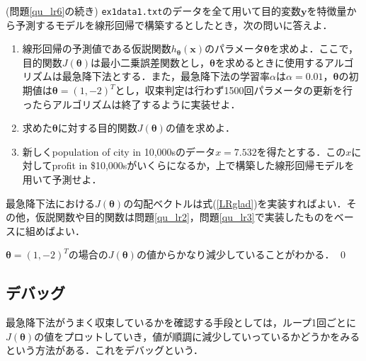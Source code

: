 \begin{qu}\label{qu_lr4}
(問題\ref{qu_lr6}の続き) \texttt{ex1data1.txt}のデータを全て用いて目的変数${\bm y}$を特徴量から予測するモデルを線形回帰で構築するとしたとき，次の問いに答えよ．
\begin{enumerate}
\item 線形回帰の予測値である仮説関数$h_{{\bm \theta}}({\bm x})$のパラメータ${\bm \theta}$を求めよ．ここで，目的関数$J({\bm \theta})$は最小二乗誤差関数とし，${\bm \theta}$を求めるときに使用するアルゴリズムは最急降下法とする．また，最急降下法の学習率$\alpha $は$\alpha = 0.01$，${\bm \theta}$の初期値は${\bm \theta}=(1,-2)^T$とし，収束判定は行わず1500回パラメータの更新を行ったらアルゴリズムは終了するように実装せよ．
\item 求めた${\bm \theta}$に対する目的関数$J({\bm \theta})$の値を求めよ．
\item 新しくpopulation of city in 10,000sのデータ$x=7.532$を得たとする．この$x$に対してprofit in \$10,000sがいくらになるか，上で構築した線形回帰モデルを用いて予測せよ．
\end{enumerate}
\end{qu}
\begin{ans}
最急降下法における$J({\bm \theta})$の勾配ベクトルは式(\ref{LRglad})を実装すればよい．その他，仮説関数や目的関数は問題\ref{qu_lr2}，問題\ref{qu_lr3}で実装したものをベースに組めばよい．
\begin{cod}[\texttt{lr4.py}]　
}]{code/lr4.py}
\vspace{-10pt}
\begin{lstlisting}
1: theta=
[[-3.55089376]
 [ 1.15838599]]
2: J=4.4878002526614615
3: y_pred=5.174069533566031
\end{lstlisting}
\end{cod}
\vspace{-10pt}
${\bm \theta}=(1,-2)^T$の場合の$J({\bm \theta})$の値からかなり減少していることがわかる．
\qed
\end{ans}







\subsection{デバッグ}

最急降下法がうまく収束しているかを確認する手段としては，ループ1回ごとに$J({\bm \theta})$の値をプロットしていき，値が順調に減少していっているかどうかをみるという方法がある．これをデバッグという．

